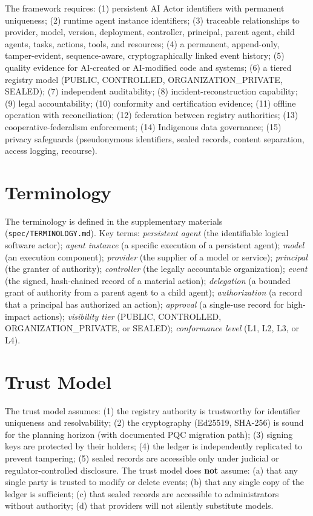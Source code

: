 \documentclass[11pt,a4paper]{article}
\begin{document}
The framework requires: (1) persistent AI Actor identifiers with permanent uniqueness; (2) runtime agent instance identifiers; (3) traceable relationships to provider, model, version, deployment, controller, principal, parent agent, child agents, tasks, actions, tools, and resources; (4) a permanent, append-only, tamper-evident, sequence-aware, cryptographically linked event history; (5) quality evidence for AI-created or AI-modified code and systems; (6) a tiered registry model (PUBLIC, CONTROLLED, ORGANIZATION\_PRIVATE, SEALED); (7) independent auditability; (8) incident-reconstruction capability; (9) legal accountability; (10) conformity and certification evidence; (11) offline operation with reconciliation; (12) federation between registry authorities; (13) cooperative-federalism enforcement; (14) Indigenous data governance; (15) privacy safeguards (pseudonymous identifiers, sealed records, content separation, access logging, recourse).

\section{Terminology}
\label{sec:terminology}

The terminology is defined in the supplementary materials (\texttt{spec/TERMINOLOGY.md}). Key terms: \textit{persistent agent} (the identifiable logical software actor); \textit{agent instance} (a specific execution of a persistent agent); \textit{model} (an execution component); \textit{provider} (the supplier of a model or service); \textit{principal} (the granter of authority); \textit{controller} (the legally accountable organization); \textit{event} (the signed, hash-chained record of a material action); \textit{delegation} (a bounded grant of authority from a parent agent to a child agent); \textit{authorization} (a record that a principal has authorized an action); \textit{approval} (a single-use record for high-impact actions); \textit{visibility tier} (PUBLIC, CONTROLLED, ORGANIZATION\_PRIVATE, or SEALED); \textit{conformance level} (L1, L2, L3, or L4).

\section{Trust Model}
\label{sec:trust-model}

The trust model assumes: (1) the registry authority is trustworthy for identifier uniqueness and resolvability; (2) the cryptography (Ed25519, SHA-256) is sound for the planning horizon (with documented PQC migration path); (3) signing keys are protected by their holders; (4) the ledger is independently replicated to prevent tampering; (5) sealed records are accessible only under judicial or regulator-controlled disclosure. The trust model does \textbf{not} assume: (a) that any single party is trusted to modify or delete events; (b) that any single copy of the ledger is sufficient; (c) that sealed records are accessible to administrators without authority; (d) that providers will not silently substitute models.
\end{document}
